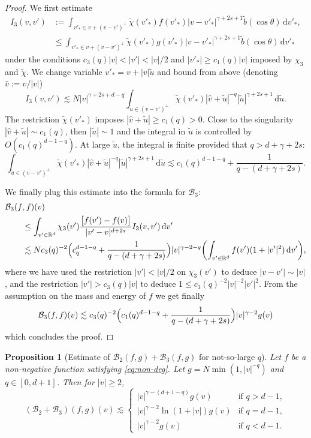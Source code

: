 \documentclass[JEP,XML,SOM,Unicode,NoFloatCountersInSection]{cedram}
\theoremstyle{plain}
\newtheorem{prop}[thm]{Proposition}
\theoremstyle{definition}
\numberwithin{equation}{section}
\newcommand{\R}{\mathbb R}
\newcommand{\dd} {\, \mathrm{d}}
\let\A N
\begin{document}
\begin{proof}
We first estimate
\[
\begin{aligned}
I_3(v,v') &:= \int_{v'_* \in v + (v-v')^\bot} \tilde \chi(v'_*)
f(v'_*) |v-v'_*|^{\gamma+2s +1} \tilde b(\cos \theta) \dd v'_*, \\
&\leq \int_{v'_* \in v + (v-v')^\bot} \tilde \chi(v'_*)
g(v'_*) |v-v'_*|^{\gamma+2s +1} \tilde b(\cos \theta) \dd v'_*
\end{aligned}
\]
under the conditions $c_3(q) |v| < |v'| < |v|/2$ and
$|v'_*| \ge c_1(q) |v|$ imposed by $\chi_3$ and $\tilde \chi$. We
change variable $v'_* = v + |v|\tilde u$ and bound from above
(denoting $\hat v:=v/|v|$)
\[
I_3(v,v') \lesssim \A |v|^{\gamma+2s+d -q} \int_{\tilde u \in
(v-v')^\bot} \tilde \chi(v'_*) \left| \hat v + \tilde u
\right|^{-q} \left| \tilde u \right|^{\gamma+2s +1} \dd \tilde u.
\]
The restriction $\tilde \chi(v'_*)$ imposes
$|\hat v + \tilde u| \ge c_1(q) >0$. Close to the singularity
$|\hat v + \tilde u| \sim c_1(q)$, then $|\tilde u| \sim 1$ and the
integral in $\tilde u$ is controlled by $O(c_1(q)^{d-1-q})$. At large
$\tilde u$, the integral is finite provided that $q >
d+\gamma+2s$:
\[
\int_{\tilde u \in
(v-v')^\bot} \tilde \chi(v'_*) \left| \hat v + \tilde u
\right|^{-q} \left| \tilde u \right|^{\gamma+2s +1} \dd \tilde u
\lesssim c_1(q)^{d-1-q} + \frac{1}{q-(d+\gamma+2s)}.
\]

We finally plug this estimate into the formula for $\mathcal{B}_3$:
\begin{align*}
\mathcal{B}_3(f&,f)(v) \\ &\le \int_{v'\in \R^d} \chi_3(v') \frac{\big[
f(v')-f(v) \big]}{|v'-v|^{d+2s}} I_3(v,v') \dd v'\\
&\lesssim \A c_3(q)^{-2} \Bigl( c_q^{d-1-q} + \frac{1}{q-(d+\gamma+2s)}
\Bigr) |v|^{\gamma-2-q} \biggl( \int_{v'\in \R^d} f(v')(1+|v'|^2) \dd
v'\biggr),
\end{align*}
where we have used the restriction $|v'|<|v|/2$ on $\chi_3(v')$ to
deduce $|v-v'| \sim |v|$, and the restriction $|v'| >c_3(q)|v|$ to
deduce $1 \le c_3(q)^{-2} |v|^{-2}|v'|^2$. From the assumption on the
mass and energy of $f$ we get finally
\[
\mathcal{B}_3(f,f)(v) \lesssim c_3(q)^{-2} \Bigl( c_1(q)^{d-1-q} +
\frac{1}{q-(d+\gamma+2s)} \Bigr) |v|^{\gamma-2} g(v)
\]
which concludes the proof.
\end{proof}


\begin{prop}[Estimate of {$\mathcal{B}_2(f,g) + \mathcal{B}_3(f,g)$} for not-so-large $q$]\label{prop:B23}
Let $f$ be a non-negative function satisfying \eqref{eq:non-deg}. Let $g = \A \min(1,|v|^{-q})$ and $q \in [0,d+1]$. Then for $|v| \ge 2$,
\[
(\mathcal{B}_2 + \mathcal{B}_3)(f,g)(v) \lesssim
\begin{cases}
|v|^{\gamma-(d+1-q)}g(v) & \text{if } q > d-1,\\
|v|^{\gamma-2} \ln (1+|v|)g(v) & \text{if } q = d-1,\\
|v|^{\gamma-2}g(v) & \text{if } q < d-1.
\end{cases}
\]
\end{prop}
\end{document}
